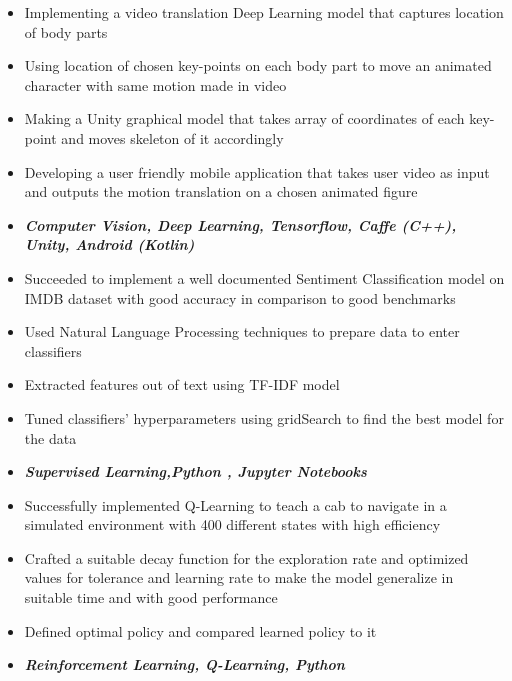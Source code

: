 

\begin{itemize}
\item Implementing a video translation Deep Learning model that captures location of body parts
\item Using location of chosen key-points on each body part to move an animated character with same motion made in video
\item Making a Unity graphical model that takes array of coordinates of each key-point and moves skeleton of it accordingly
\item Developing a user friendly mobile application that takes user video as input and outputs the motion translation on a chosen animated figure
\item \textit{\textbf{Computer Vision, Deep Learning, Tensorflow, Caffe (C++), Unity, Android (Kotlin)}}
\end{itemize}
\divider
{}
\begin{itemize}
\item Succeeded to implement a well documented Sentiment Classification model on IMDB dataset with good accuracy in comparison to good benchmarks
\item Used Natural Language Processing techniques to prepare data to enter classifiers
\item Extracted features out of text using TF-IDF model
\item Tuned classifiers' hyperparameters using gridSearch to find the best model for the data
\item \textit{\textbf{Supervised Learning,Python , Jupyter Notebooks }}
\end{itemize}


\divider
{}
\begin{itemize}
\item Successfully implemented Q-Learning to teach a cab to navigate in a simulated environment with 400 different states with high efficiency
\item Crafted a suitable decay function for the exploration rate and optimized values for tolerance and learning rate to make the model generalize in suitable time and with good performance
\item Defined optimal policy and compared learned policy to it
\item \textit{\textbf{Reinforcement Learning, Q-Learning, Python}}
\end{itemize}


